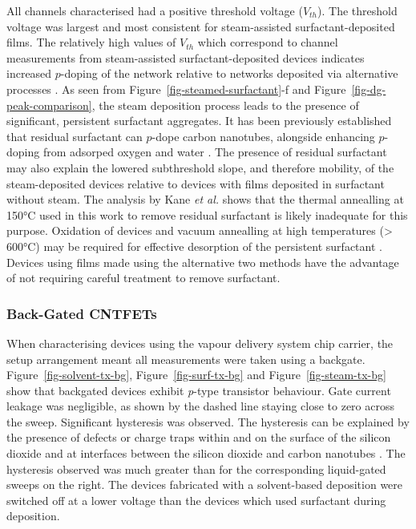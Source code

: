 \documentclass[
  a4paper,
]{scrbook}
\begin{document}
All channels characterised had a positive threshold voltage
(\(V_{th}\)). The threshold voltage was largest and most consistent for
steam-assisted surfactant-deposited films. The relatively high values of
\(V_{th}\) which correspond to channel measurements from steam-assisted
surfactant-deposited devices indicates increased \(p\)-doping of the
network relative to networks deposited via alternative processes
\autocite{Kang2005,Heller2008,Murugathas2018}. As seen from
Figure~\ref{fig-steamed-surfactant}-f and
Figure~\ref{fig-dg-peak-comparison}, the steam deposition process leads
to the presence of significant, persistent surfactant aggregates. It has
been previously established that residual surfactant can \(p\)-dope
carbon nanotubes, alongside enhancing \(p\)-doping from adsorped oxygen
and water \autocite{Kane2014,Nonoguchi2018,Christensen2022}. The
presence of residual surfactant may also explain the lowered
subthreshold slope, and therefore mobility, of the steam-deposited
devices relative to devices with films deposited in surfactant without
steam. The analysis by Kane \emph{et al.} shows that the thermal
annealling at 150°C used in this work to remove residual surfactant is
likely inadequate for this purpose. Oxidation of devices and vacuum
annealling at high temperatures (\textgreater{} 600°C) may be required
for effective desorption of the persistent surfactant
\autocite{Kane2014,Barnett2018}. Devices using films made using the
alternative two methods have the advantage of not requiring careful
treatment to remove surfactant.

\hypertarget{back-gated-cntfets}{%
\subsubsection*{Back-Gated CNTFETs}\label{back-gated-cntfets}}

When characterising devices using the vapour delivery system chip
carrier, the setup arrangement meant all measurements were taken using a
backgate. Figure~\ref{fig-solvent-tx-bg}, Figure~\ref{fig-surf-tx-bg}
and Figure~\ref{fig-steam-tx-bg} show that backgated devices exhibit
\emph{p}-type transistor behaviour. Gate current leakage was negligible,
as shown by the dashed line staying close to zero across the sweep.
Significant hysteresis was observed. The hysteresis can be explained by
the presence of defects or charge traps within and on the surface of the
silicon dioxide and at interfaces between the silicon dioxide and carbon
nanotubes \autocite{Lee2007,Lee2012,Ha2014}. The hysteresis observed was
much greater than for the corresponding liquid-gated sweeps on the
right. The devices fabricated with a solvent-based deposition were
switched off at a lower voltage than the devices which used surfactant
during deposition.
\end{document}

